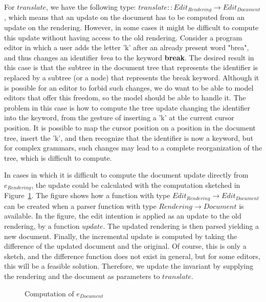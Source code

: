 For $translate$, we have the following type: $translate :: Edit_{Rendering} \rightarrow Edit_{Document}$, which means that an update on the document has to be computed from an update on the rendering. However, in some cases it might be difficult to compute this update without having access to the old rendering. Consider a program editor in which a user adds the letter 'k' after an already present word "brea", and thus changes an identifier {\em brea} to the keyword {\bf break}. The desired result in this case is that the subtree in the document tree that represents the identifier is replaced by a subtree (or a node) that represents the break keyword. Although it is possible for an editor to forbid such changes, we do want to be able to model editors that offer this freedom, so the model should be able to handle it. The problem in this case is how to compute the tree update changing the identifier into the keyword, from the gesture of inserting a 'k' at the current cursor position. It is possible to map the cursor position on a position in the document tree, insert the 'k', and then recognize that the identifier is now a keyword, but for complex grammars, such changes may lead to a complete reorganization of the tree, which is difficult to compute.

In cases in which it is difficult to compute the document update directly from $e_{Rendering}$, the update could be calculated with the computation sketched in Figure~\ref{computeintentions}. The figure shows how a function with type $Edit_{Rendering} \rightarrow Edit_{Document}$ can be created when a parser function with type $Rendering \rightarrow Document$ is available. In the figure, the edit intention is applied as an update to the old rendering, by a function $update$. The updated rendering is then parsed yielding a new document. Finally, the incremental update is computed by taking the difference of the updated document and the original. Of course, this is only a sketch, and the difference function does not exist in general, but for some editors, this will be a feasible solution. Therefore, we update the invariant by supplying the rendering and the document as parameters to $translate$.
\begin{figure}
\begin{small}
\begin{center}
\begin{center}
\begin{small}
\bigskip \noindent
{}
\end{small}
\end{center}\caption{Computation of $e_{Document}$ }\label{computeintentions} 
\end{center}
\end{small}
\end{figure}


